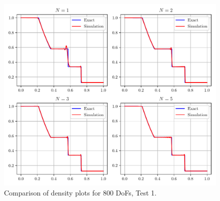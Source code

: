 \documentclass[a4paper,11pt,oneside]{article}
\begin{document}
\begin{figure}[htbp]
	\includegraphics[width=\linewidth]{figures/riemann_1d/test1-1/dof800_12_12_chandrashekhar.pdf}
	\caption{Comparison of density plots for 800 DoFs, Test 1.}
	\label{fig:test1-1_dof800_chandrashekhar}
\end{figure}
\end{document}
